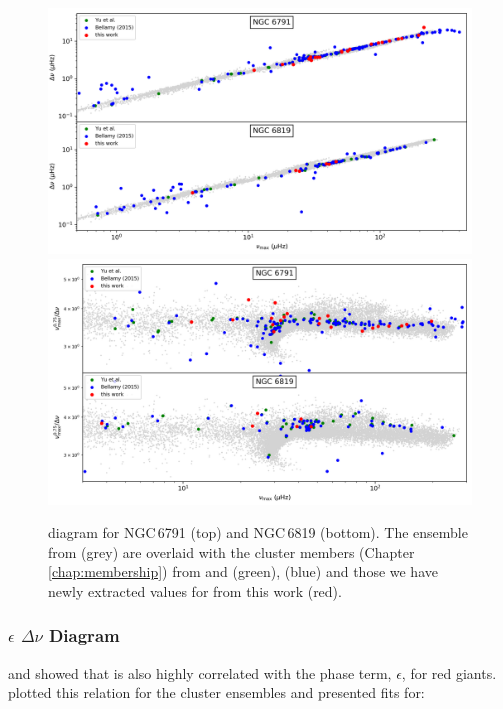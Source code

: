 \begin{figure}
    \centering
    \includegraphics[width=\linewidth]{Chapter5/numax_dnu_both_2.png}
    \includegraphics[width=\linewidth]{Chapter5/numax_dnusc_both_2.png}
    \caption[\numax{} \textendash \dnu{} diagram for NGC\,6791 and NGC\, 6819]{\numax{} \textendash \dnu{} diagram for NGC\,6791 (top) and NGC\,6819 (bottom). The ensemble from \cite{yu_asteroseismology_2018-1} (grey) are overlaid with the cluster members (Chapter \ref{chap:membership}) from \cite{yu_asteroseismology_2018-1} and \cite{yu_asteroseismology_2020} (green), \cite{bellamy_using_2015} (blue) and those we have newly extracted values for from this work (red). }
    \label{fig:nike_6791}
\end{figure}

\subsubsection{$\epsilon$ \textendash $\Delta\nu$ Diagram}

\cite{huber_asteroseismology_2010} and \cite{mosser_mixed_2011} showed that \dnu{} is also highly correlated with the phase term, $\epsilon$, for red giants. \cite{corsaro_asteroseismology_2012} plotted this relation for the cluster ensembles and presented fits for:

